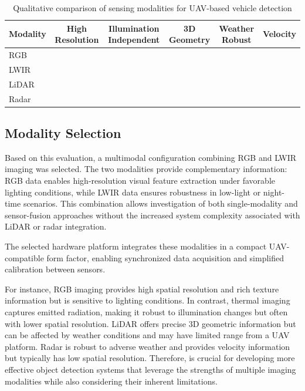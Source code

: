 \documentclass[12pt,oneside,bibtotoc,liststotoc]{scrbook}
\newcommand{\cmark}{\ding{51}}
\begin{document}
\begin{table}[t]
\centering
\caption{Qualitative comparison of sensing modalities for UAV-based vehicle detection}
\label{tab:modality_comparison}

\begin{tabular}{l c c c c c}
\toprule
\textbf{Modality} 
& \textbf{High Resolution} 
& \textbf{Illumination Independent} 
& \textbf{3D Geometry} 
& \textbf{Weather Robust} 
& \textbf{Velocity} \\
\midrule
RGB    & \cmark &  &  &  &  \\
LWIR   &        & \cmark &  &  &  \\
LiDAR  &        & \cmark & \cmark &  &  \\
Radar  &        & \cmark &  & \cmark & \cmark \\
\bottomrule
\end{tabular}
\end{table}


\subsection{Modality Selection}

Based on this evaluation, a multimodal configuration combining
RGB and LWIR imaging was selected. The two modalities provide
complementary information: RGB data enables high-resolution
visual feature extraction under favorable lighting conditions,
while LWIR data ensures robustness in low-light or night-time
scenarios. This combination allows investigation of both
single-modality and sensor-fusion approaches without the
increased system complexity associated with LiDAR or radar
integration.

The selected hardware platform integrates these modalities in a
compact UAV-compatible form factor, enabling synchronized
data acquisition and simplified calibration between sensors.

For instance, RGB 
imaging provides high spatial resolution and rich texture 
information but is sensitive to lighting conditions. In contrast, 
thermal imaging captures emitted radiation, making it robust to 
illumination changes but often with lower spatial resolution. 
LiDAR offers precise 3D geometric information but can be affected 
by weather conditions and may have limited range from a UAV platform. 
Radar is robust to adverse weather and provides velocity information 
but typically has low spatial resolution.
Therefore, is crucial for developing
more effective object detection systems that leverage the strengths
of multiple imaging modalities while also considering their inherent
limitations.
\cite{bustos2023reviewObjectDetectionIR}
\end{document}
